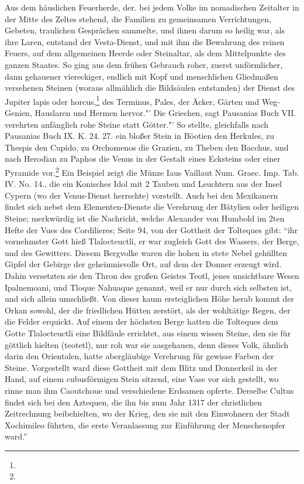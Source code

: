\documentclass[a4paper, 11pt, oneside, polutonikogreek, german]{article}
\begin{document}
Aus dem häuslichen Feuerherde, der. bei jedem Volke im nomadischen Zeitalter in der Mitte des Zeltes stehend, die Familien zu gemeinsamen Verrichtungen, Gebeten, traulichen Gesprächen sammelte, und ihnen darum so heilig war, als ihre Laren, entstand der Vesta-Dienst, und mit ihm die Bewahrung des reinen Feuers, auf dem allgemeinen Heerde oder Steinaltar, als dem Mittelpunkte des ganzen Staates. So ging aus dem frühen Gebrauch roher, zuerst unförmlicher, dann gehauener viereckiger, endlich mit Kopf und menschlichen Gliedmaßen versehenen Steinen (woraus allmählich die Bildsäulen entstanden) der Dienst des Jupiter lapis oder horcus,\footnote{} des Terminus, Pales, der Äcker, Gärten und Weg- Genien, Hauslaren und Hermen hervor."' Die Griechen, sagt Pausanias Buch VII. verehrten anfänglich rohe Steine statt Götter."' So stellte, gleichfalls nach Pausanias Buch IX. K. 24. 27. ein bloßer Stein in Böotien den Herkules, zu Thespis den Cupido, zu Orchomenos die Grazien, zu Theben den Bacchus, und nach Herodian zu Paphos die Venus in der Gestalt eines Ecksteins oder einer Pyramide vor.\footnote{} Ein Beispiel zeigt die Münze Iaus Vaillaut Num. Graec. Imp. Tab. IV. No. 14., die ein Konisches Idol mit 2 Tauben und Leuchtern aus der Insel Cypern (wo der Venus-Dienst herrschte) vorstellt. Auch bei den Mexikanern findet sich nebst dem Elementen-Dienste die Verehrung der Bätylien oder heiligen Steine; merkwürdig ist die Nachricht, welche Alexander von Humbold im 2ten Hefte der Vues des Cordilieres; Seite 94, von der Gottheit der Tolteques gibt: "`ihr vornehmster Gott hieß Tlalocteuctli, er war zugleich Gott des Wassers, der Berge, und des Gewitters. Diesem Bergvolke waren die hohen in stete Nebel gehüllten Gipfel der Gebirge der geheimnisvolle Ort, auf dem der Donner erzeugt wird. Dahin versetzten sie den Thron des großen Geistes Teotl, jenes unsichtbare Wesen Ipalnemoani, und Tloque Nahuaque genannt, weil er nur durch sich selbsten ist, und sich allein umschließt. Von dieser kaum ersteiglichen Höhe herab kommt der Orkan sowohl, der die friedlichen Hütten zerstört, als der wohltätige Regen, der die Felder erquickt. Auf einem der höchsten Berge hatten die Tolteques dem Gotte Tlalocteuctli eine Bildfäule errichtet, aus einem wissen Steine, den sie für göttlich hielten (teotetl), nur roh war sie aasgehauen, denn dieses Volk, ähnlich darin den Orientalen, hatte abergläubige Verehrung für gewisse Farben der Steine. Vorgestellt ward diese Gottheit mit dem Blitz und Donnerkeil in der Hand, auf einem cubusförmigen Stein sitzend, eine Vase vor sich gestellt, wo rinne man ihm Caoutchoue und verschiedene Erdsamen opferte. Derselbe Cultus findet sich bei den Aztequen, die ihn bis zum Jahr 1317 der christlichen Zeitrechnung beibehielten, wo der Krieg, den sie mit den Einwohnern der Stadt Xochimileo führten, die erste Veranlassung zur Einführung der Menschenopfer ward."'
\end{document}
